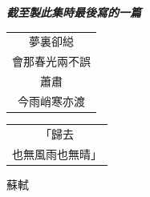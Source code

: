 \documentclass{ctexart}
\begin{document}
		\begin{titlepage}
		\thispagestyle{empty}
		
		\begingroup
		\setlength{\parindent}{0pt}
		\setlength{\parskip}{0pt}
		
		\noindent
		{\large \itshape \bfseries 截至製此集時最後寫的一篇}
		
		\vspace{2.0cm} 
		
		\begin{center}
		
			\vspace{0.3cm}
			
			\begin{minipage}{\linewidth}
				\centering
				{\large \itshape
					\begin{tabular}{@{}c@{}}
						夢裏卻縂\\
						會那春光兩不誤\\
						蕭肅\\
						今雨峭寒亦渡\\
					\end{tabular}
				}
			\end{minipage}
			
		\end{center}
		
		\endgroup
	\end{titlepage}
	
	\begin{titlepage}
		\thispagestyle{empty}
		\begingroup
		\setlength{\parindent}{0pt}
		\setlength{\parskip}{0pt}
		\centering
		
		\vspace*{\fill}
		
		{\large \itshape
			\begin{tabular}{@{}c@{}}
				「歸去\\
				也無風雨也無晴」
			\end{tabular}
		}
		
		\vspace{0.35cm}
		
		{\large \itshape \par}%
		{\large \itshape
			\begin{center}
				蘇軾
			\end{center}
		}
		
		\vspace*{\fill}
		\endgroup
	\end{titlepage}
	
\end{document}
